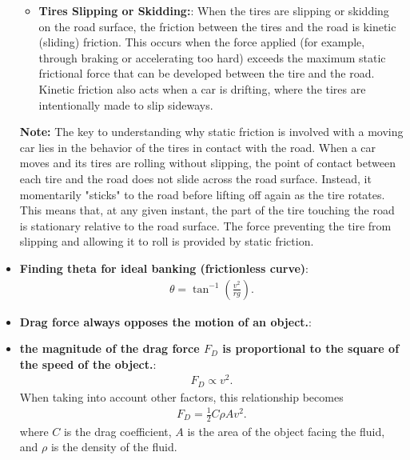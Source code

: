 \documentclass{report}
\begin{document}
\begin{itemize}
\begin{itemize}
                        \item \textbf{Tires Slipping or Skidding:}: When the tires are slipping or skidding on the road surface, the friction between the tires and the road is kinetic (sliding) friction. This occurs when the force applied (for example, through braking or accelerating too hard) exceeds the maximum static frictional force that can be developed between the tire and the road. Kinetic friction also acts when a car is drifting, where the tires are intentionally made to slip sideways.
                    \end{itemize}
                    \bigbreak \noindent 
                    \textbf{Note:} The key to understanding why static friction is involved with a moving car lies in the behavior of the tires in contact with the road. When a car moves and its tires are rolling without slipping, the point of contact between each tire and the road does not slide across the road surface. Instead, it momentarily "sticks" to the road before lifting off again as the tire rotates. This means that, at any given instant, the part of the tire touching the road is stationary relative to the road surface. The force preventing the tire from slipping and allowing it to roll is provided by static friction.
                \item \textbf{Finding theta for ideal banking (frictionless curve)}:
                    \begin{align*}
                        \theta = \tan^{-1}{\left(\frac{v^{2}}{rg}\right)}
                    .\end{align*}
                \item \textbf{Drag force always opposes the motion of an object.}:
                \item \textbf{the magnitude of the drag force $F_{D}$ is proportional to the square of the speed of the object.}:
                    \begin{align*}
                        F_{D} \propto v^{2}
                    .\end{align*}
                     When taking into account other factors, this relationship becomes
                     \begin{align*}
                         F_{D} = \frac{1}{2}C\rho Av^{2}
                     .\end{align*}
                     where $C$ is the drag coefficient, $A$ is the area of the object facing the fluid, and $\rho$ is the density of the fluid.
                     \bigbreak \noindent 

\end{itemize}
\end{document}
